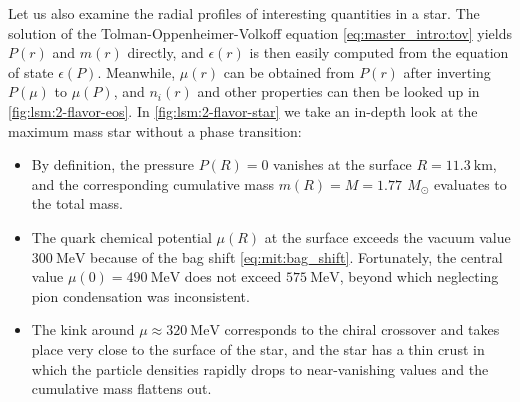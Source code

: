 Let us also examine the radial profiles of interesting quantities in a star.
The solution of the Tolman-Oppenheimer-Volkoff equation \eqref{eq:master_intro:tov} yields $P(r)$ and $m(r)$ directly,
and $\epsilon(r)$ is then easily computed from the equation of state $\epsilon(P)$.
Meanwhile, $\mu(r)$ can be obtained from $P(r)$ after inverting $P(\mu)$ to $\mu(P)$,
and $n_i(r)$ and other properties can then be looked up in \cref{fig:lsm:2-flavor-eos}.
In \cref{fig:lsm:2-flavor-star} we take an in-depth look at the maximum mass star without a phase transition:
\begin{itemize}
\label{list:lsm:2-flavor-star-discussion}
\item By definition, the pressure $P(R)=0$ vanishes at the surface $R=\SI{11.3}{\kilo\meter}$,
      and the corresponding cumulative mass $m(R)=M=\SI{1.77}{}\,M_\odot$ evaluates to the total mass.
\item The quark chemical potential $\mu(R)$ at the surface exceeds the vacuum value $\SI{300}{\mega\electronvolt}$ because of the bag shift \eqref{eq:mit:bag_shift}.
      Fortunately, the central value $\mu(0) = \SI{490}{\mega\electronvolt}$ does not exceed $\SI{575}{\mega\electronvolt}$,
      beyond which neglecting pion condensation was inconsistent. %
\item The kink around $\mu \approx \SI{320}{\mega\electronvolt}$ corresponds to the chiral crossover and takes place very close to the surface of the star,
      and the star has a thin crust in which the particle densities rapidly drops to near-vanishing values and the cumulative mass flattens out.
\end{itemize}

